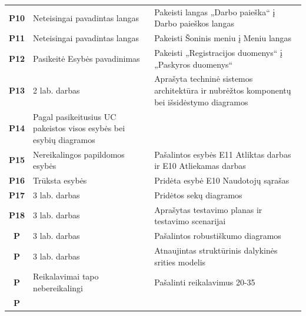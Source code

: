 \documentclass{VUMIFPSbakalaurinis}
\begin{document}
\begin{table}[H]
{{\begin{tabular}{|c|m{5.75cm}|m{5.75cm}|}
		\textbf{P10} & Neteisingai pavadintas langas & Pakeisti langas  „Darbo paieška“ į Darbo paieškos langas \\
		\textbf{P11} & Neteisingai pavadintas langas & Pakeisti Šoninis meniu į Meniu langas \\
		\textbf{P12} & Pasikeitė Esybės pavadinimas & Pakeisti „Registracijos duomenys“ į „Paskyros duomenys“ \\
		\textbf{P13} & 2 lab. darbas & Aprašyta techninė sistemos architektūra ir nubrėžtos komponentų bei išsidėstymo diagramos \\
		\textbf{P14} & Pagal pasikeitusius UC pakeistos visos esybės bei esybių diagramos & \\
		\textbf{P15} & Nereikalingos papildomos esybės & Pašalintos esybės E11 Atliktas darbas ir E10 Atliekamas darbas \\
		\textbf{P16} & Trūksta esybės & Pridėta esybė E10 Naudotojų sąrašas \\
		\textbf{P17} & 3 lab. darbas & Pridėtos sekų diagramos \\
		\textbf{P18} & 3 lab. darbas & Aprašytas testavimo planas ir testavimo scenarijai \\
		\textbf{P} & 3 lab. darbas & Pašalintos robustiškumo diagramos \\
		\textbf{P} & 3 lab. darbas & Atnaujintas struktūrinis dalykinės srities modelis \\
		\textbf{P} & Reikalavimai tapo nebereikalingi & Pašalinti reikalavimus 20-35 \\
		\textbf{P} & & \\
		\hline
	\end{tabular}}
	}
	\label{tab:mistake table}
\end{table}
\end{document}
